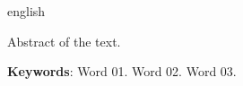 

\begin{resumo}[Abstract]
	\begin{otherlanguage*}{english}
		\SingleSpacing
		
		Abstract of the text.
		
		\noindent 
		\textbf{Keywords}: Word 01. Word 02. Word 03.
	\end{otherlanguage*}
\end{resumo}


